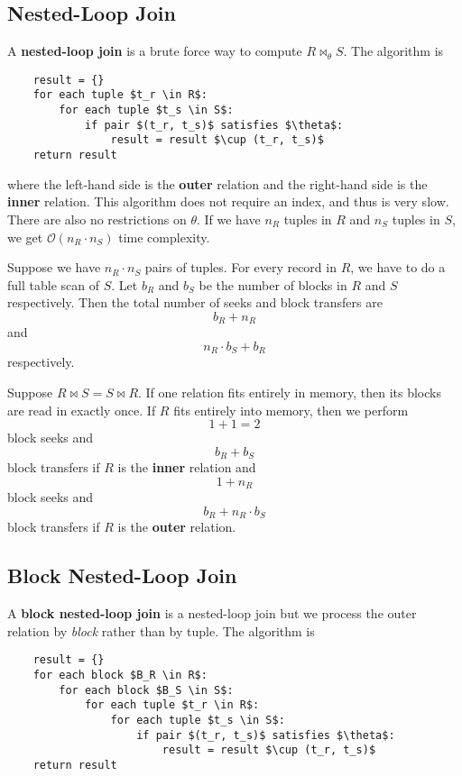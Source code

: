 \documentclass{report}
\newenvironment{example}{\begin{tcolorbox}[title={Example},colback=green!5!white,colframe=black!75!green]}{\end{tcolorbox}}
\renewcommand{\bf}[1]{\textbf{{#1}}}
\renewcommand{\it}[1]{\textit{{#1}}}
\begin{document}
\subsection{Nested-Loop Join}
A \bf{nested-loop join} is a brute force way to compute $R \bowtie_{\theta} S$.
The algorithm is
\lstset{ basicstyle=\small\ttfamily, mathescape }
{
    \centering
    \begin{lstlisting}
    result = {}
    for each tuple $t_r \in R$:
        for each tuple $t_s \in S$:
            if pair $(t_r, t_s)$ satisfies $\theta$:
                result = result $\cup (t_r, t_s)$
    return result
    \end{lstlisting}
    \par
}
where the left-hand side is the \bf{outer} relation and the right-hand side is
the \bf{inner} relation. This algorithm does not require an index, and thus is
very slow. There are also no restrictions on $\theta$. If we have
$n_R$ tuples in $R$ and $n_S$ tuples in $S$, we get $\mathcal{O}(n_R \cdot n_S)$
time complexity.
\begin{example}
    Suppose we have $n_R \cdot n_S$ pairs of tuples. For every record in $R$, we
    have to do a full table scan of $S$. Let $b_R$ and $b_S$ be the number of
    blocks in $R$ and $S$ respectively. Then the total number of seeks and block
    transfers are
    \[b_R + n_R\]
    and
    \[n_R \cdot b_S + b_R\]
    respectively.
\end{example}
\begin{example}
    Suppose $R \bowtie S = S \bowtie R$. If one relation fits entirely in
    memory, then its blocks are read in exactly once. If $R$ fits entirely into
    memory, then we perform
    \[1 + 1 = 2\]
    block seeks and
    \[b_R + b_S\]
    block transfers if $R$ is the \bf{inner} relation and
    \[1 + n_R\]
    block seeks and
    \[b_R + n_R \cdot b_S\]
    block transfers if $R$ is the \bf{outer} relation.
\end{example}

\subsection{Block Nested-Loop Join}
A \bf{block nested-loop join} is a nested-loop join but we process the outer
relation by \it{block} rather than by tuple. The algorithm is
\lstset{ basicstyle=\small\ttfamily, mathescape }
{
    \centering
    \begin{lstlisting}
    result = {}
    for each block $B_R \in R$:
        for each block $B_S \in S$:
            for each tuple $t_r \in R$:
                for each tuple $t_s \in S$:
                    if pair $(t_r, t_s)$ satisfies $\theta$:
                        result = result $\cup (t_r, t_s)$
    return result
    \end{lstlisting}
    \par
}
\end{document}
